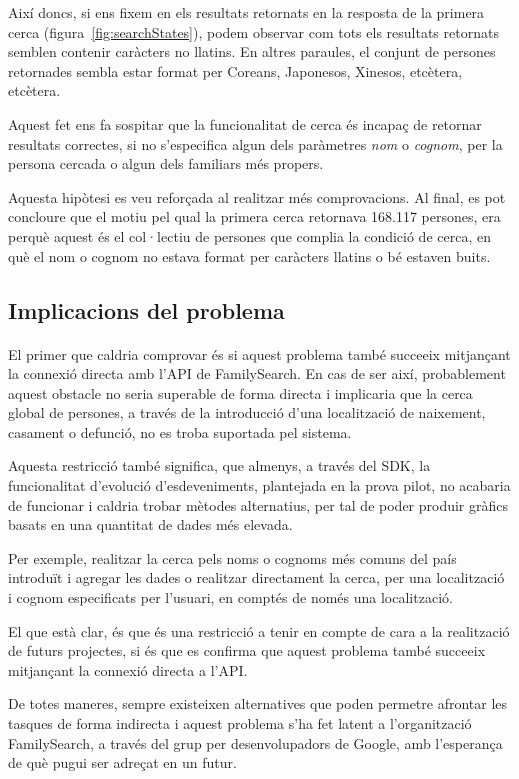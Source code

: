 Així doncs, si ens fixem en els resultats retornats en la resposta de la primera cerca (figura~\ref{fig:searchStates}), podem observar com tots els resultats retornats semblen contenir caràcters no llatins. En altres paraules, el conjunt de persones retornades sembla estar format per Coreans, Japonesos, Xinesos, etcètera, etcètera.

Aquest fet ens fa sospitar que la funcionalitat de cerca és incapaç de retornar resultats correctes, si no s'especifica algun dels paràmetres \emph{nom} o \emph{cognom}, per la persona cercada o algun dels familiars més propers.

Aquesta hipòtesi es veu reforçada al realitzar més comprovacions. Al final, es pot concloure que el motiu pel qual la primera cerca retornava 168.117 persones, era perquè aquest és el col·lectiu de persones que complia la condició de cerca, en què el nom o cognom no estava format per caràcters llatins o bé estaven buits.


\subsection{Implicacions del problema}

\paragraph{}
El primer que caldria comprovar és si aquest problema també succeeix mitjançant la connexió directa amb l'API de FamilySearch. En cas de ser així, probablement aquest obstacle no seria superable de forma directa i implicaria que la cerca global de persones, a través de la introducció d'una localització de naixement, casament o defunció, no es troba suportada pel sistema.

Aquesta restricció també significa, que almenys, a través del SDK, la funcionalitat d'evolució d'esdeveniments, plantejada en la prova pilot, no acabaria de funcionar i caldria trobar mètodes alternatius, per tal de poder produir gràfics basats en una quantitat de dades més elevada.

Per exemple, realitzar la cerca pels noms o cognoms més comuns del país introduït i agregar les dades o realitzar directament la cerca, per una localització i cognom especificats per l'usuari, en comptés de només una localització.

El que està clar, és que és una restricció a tenir en compte de cara a la rea\-lit\-za\-ció de futurs projectes, si és que es confirma que aquest problema també succeeix mitjançant la connexió directa a l'API.

De totes maneres, sempre existeixen alternatives que poden permetre afrontar les tasques de forma indirecta i aquest problema s'ha fet latent a l'organització Family\-Search, a través del grup per desenvolupadors de Google, amb l'esperança de què pugui ser adreçat en un futur.
